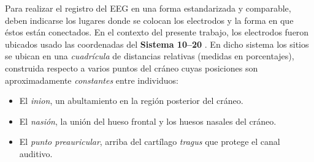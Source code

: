 \documentclass[12pt,letterpaper]{book}
\newcommand{\hz}{\si{\hertz}\xspace}
\begin{document}

Para realizar el registro del EEG en una forma estandarizada y comparable, deben indicarse los lugares donde se colocan los electrodos y la forma en que éstos están conectados.
%
En el contexto del presente trabajo, los electrodos fueron ubicados usado las coordenadas del \textbf{Sistema 10--20} \cite{Klem99}.
%
En dicho sistema los sitios se ubican en una \textit{cuadrícula} de distancias relativas (medidas en porcentajes), construida respecto a varios puntos del cráneo cuyas posiciones son aproximadamente \textit{constantes} entre individuos:
\begin{itemize}
\item El \textit{inion}, un abultamiento en la región posterior del cráneo.
\item El \textit{nasión}, la unión del hueso frontal y los huesos nasales del cráneo.
\item El \textit{punto preauricular}, arriba del cartílago \textit{tragus} que protege el canal auditivo.
\end{itemize}
\end{document}
